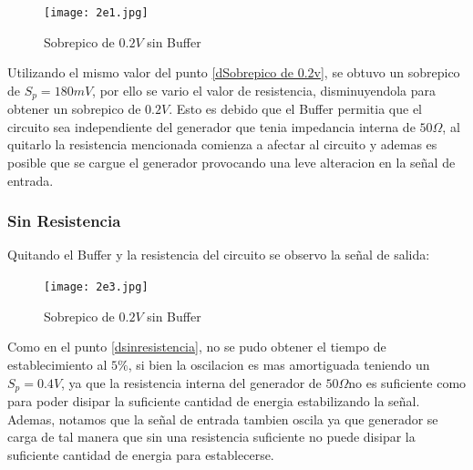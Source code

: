 \begin{figure}[h!]
\centering
\texttt{[image: 2e1.jpg]}
\caption{Sobrepico de $0.2V$ sin Buffer} 	
\label{fig:LRC2e1}
\end{figure}

Utilizando el mismo valor del punto \ref{dSobrepico de 0.2v}, se obtuvo un sobrepico de $S_p = 180mV$, por ello se vario el valor de resistencia, disminuyendola para obtener un sobrepico de $0.2V$. Esto es debido que el Buffer permitia que el circuito sea independiente del generador que tenia impedancia interna de $50\Omega$, al quitarlo la resistencia mencionada comienza a afectar al circuito y ademas es posible que se cargue el generador provocando una leve alteracion en la señal de entrada.

\subsubsection{Sin Resistencia}

Quitando el Buffer y la resistencia del circuito se observo la señal de salida:

\begin{figure}[h!]
\centering
\texttt{[image: 2e3.jpg]}
\caption{Sobrepico de $0.2V$ sin Buffer} 	
\label{fig:LRC2e3}
\end{figure}

Como en el punto \ref{dsinresistencia}, no se pudo obtener el tiempo de establecimiento al $5\%$, si bien la oscilacion es mas amortiguada teniendo un $S_p = 0.4V$, ya que la resistencia interna del generador de $50\Omega$no es suficiente como para poder disipar la suficiente cantidad de energia estabilizando la señal. Ademas, notamos que la señal de entrada tambien oscila ya que generador se carga de tal manera que sin una resistencia suficiente no puede disipar la suficiente cantidad de energia para establecerse.


